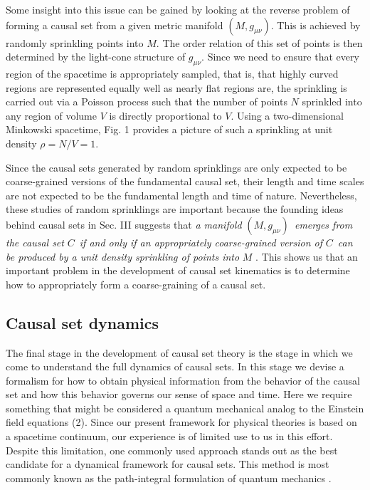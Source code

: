 \documentclass[aps,amssymb,12pt]{revtex4-2}
\begin{document}
Some insight into this issue can be gained by looking at the reverse problem
of forming a causal set from a given metric manifold $(M,g_{\mu \nu })$.
This is achieved by randomly sprinkling points into $M$. The order relation
of this set of points is then determined by the light-cone structure of $%
g_{\mu \nu }$. Since we need to ensure that every region of the spacetime is
appropriately sampled, that is, that highly curved regions are represented
equally well as nearly flat regions are, the sprinkling is carried out via a
Poisson process \cite{24} such that the number of points $N$ sprinkled into any
region of volume $V$ is directly proportional to $V$. Using a
two-dimensional Minkowski spacetime, Fig. 1 provides a picture of such a
sprinkling at unit density $\rho =N/V=1$.

Since the causal sets generated by random sprinklings are only expected to
be coarse-grained versions of the fundamental causal set, their length and
time scales are not expected to be the fundamental length and time of
nature. Nevertheless, these studies of random sprinklings are important
because the founding ideas behind causal sets in Sec. III suggests that {\it %
a manifold }$(M,g_{\mu \nu })${\it \ emerges from the causal set }$C${\it \
if and only if an appropriately coarse-grained version of }$C${\it \ can be
produced by a unit density sprinkling of points into }$M$ \cite{25}. This shows
us that an important problem in the development of causal set kinematics is
to determine how to appropriately form a coarse-graining of a causal set.

\subsection{Causal set dynamics}

The final stage in the development of causal set theory is the stage in
which we come to understand the full dynamics of causal sets. In this stage
we devise a formalism for how to obtain physical information from the
behavior of the causal set and how this behavior governs our sense of space
and time. Here we require something that might be considered a quantum
mechanical analog to the Einstein field equations (2). Since our present
framework for physical theories is based on a spacetime continuum, our
experience is of limited use to us in this effort. Despite this limitation,
one commonly used approach stands out as the best candidate for a dynamical
framework for causal sets. This method is most commonly known as the
path-integral formulation of quantum mechanics \cite{26}.
\end{document}
